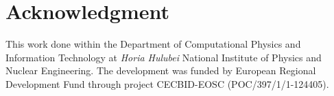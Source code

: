 \documentclass[conference]{IEEEtran}
\begin{document}
\section*{Acknowledgment}

This work done within the Department of Computational Physics and Information Technology at \emph{Horia Hulubei} National Institute of Physics and Nuclear Engineering. The development was funded by European Regional Development Fund through project CECBID-EOSC (POC/397/1/1-124405).



\end{document}
